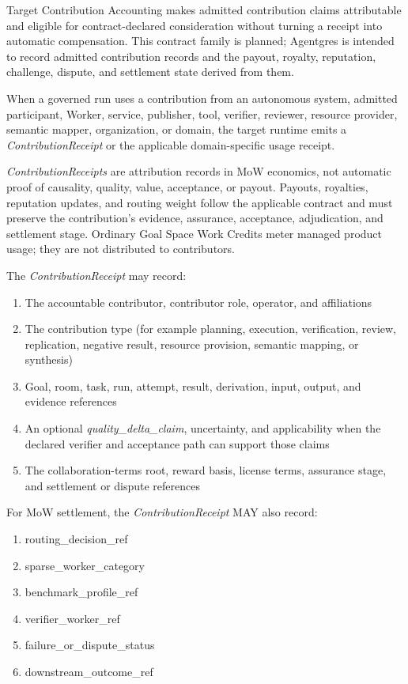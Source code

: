 \documentclass[
  11pt,
]{article}
\providecommand{\tightlist}{%
  \setlength{\itemsep}{0pt}\setlength{\parskip}{0pt}}
\begin{document}
Target Contribution Accounting makes admitted contribution claims attributable
and eligible for contract-declared consideration without turning a receipt into
automatic compensation. This contract family is planned; Agentgres is intended
to record admitted contribution records and the payout, royalty, reputation,
challenge, dispute, and settlement state derived from them.

When a governed run uses a contribution from an autonomous system, admitted
participant, Worker, service, publisher, tool, verifier, reviewer, resource
provider, semantic mapper, organization, or domain, the target runtime emits a
\emph{ContributionReceipt} or the applicable domain-specific usage receipt.

\emph{ContributionReceipts} are attribution records in MoW economics, not
automatic proof of causality, quality, value, acceptance, or payout. Payouts,
royalties, reputation updates, and routing weight follow the applicable
contract and must preserve the contribution's evidence, assurance,
acceptance, adjudication, and settlement stage. Ordinary Goal Space Work
Credits meter managed product usage; they are not distributed to contributors.

The \emph{ContributionReceipt} may record:

\begin{enumerate}
\def\labelenumi{\arabic{enumi}.}
\tightlist
\item
  The accountable contributor, contributor role, operator, and affiliations
\item
  The contribution type (for example planning, execution, verification,
  review, replication, negative result, resource provision, semantic mapping,
  or synthesis)
\item
  Goal, room, task, run, attempt, result, derivation, input, output, and evidence
  references
\item
  An optional \emph{quality\_delta\_claim}, uncertainty, and applicability when
  the declared verifier and acceptance path can support those claims
\item
  The collaboration-terms root, reward basis, license terms, assurance stage,
  and settlement or dispute references
\end{enumerate}

For MoW settlement, the \emph{ContributionReceipt} MAY also record:

\begin{enumerate}
\def\labelenumi{\arabic{enumi}.}
\tightlist
\item
  routing\_decision\_ref
\item
  sparse\_worker\_category
\item
  benchmark\_profile\_ref
\item
  verifier\_worker\_ref
\item
  failure\_or\_dispute\_status
\item
  downstream\_outcome\_ref
\end{enumerate}
\end{document}
